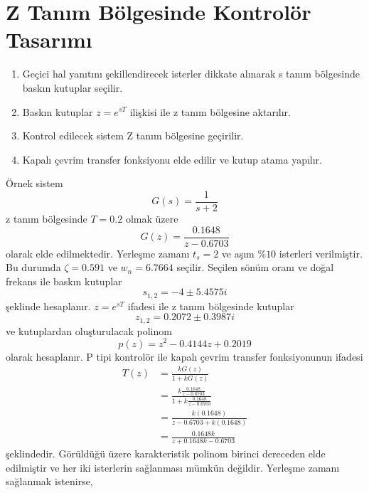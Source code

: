 \chapter{Z Tanım Bölgesinde Kontrolör Tasarımı}
\begin{enumerate}
    \item Geçici hal yanıtını şekillendirecek isterler dikkate alınarak s tanım bölgesinde baskın kutuplar seçilir. 
    \item Baskın kutuplar $z=e^{sT}$ ilişkisi ile z tanım bölgesine aktarılır. 
    \item Kontrol edilecek sistem Z tanım bölgesine geçirilir. 
    \item Kapalı çevrim transfer fonksiyonu elde edilir ve kutup atama yapılır.
\end{enumerate}
Örnek sistem
\begin{equation}
    G(s)=\frac{1}{s+2}
\end{equation}
z tanım bölgesinde $T=0.2$ olmak üzere
\begin{equation}
    G(z)=\frac{0.1648}{z-0.6703}
\end{equation}
olarak elde edilmektedir. Yerleşme zamanı $t_s=2$ ve aşım $\%10$ isterleri verilmiştir. Bu durumda $\zeta=0.591$ ve $w_n=6.7664$ seçilir. Seçilen sönüm oranı ve doğal frekans ile baskın kutuplar
\begin{equation}
    s_{1,2}=-4 \pm 5.4575i
\end{equation}
şeklinde hesaplanır. $z=e^{sT}$ ifadesi ile z tanım bölgesinde kutuplar
\begin{equation}
    z_{1,2}=0.2072 \pm 0.3987i
\end{equation}
ve kutuplardan oluşturulacak polinom
\begin{equation}
    p(z)=z^2-0.4144 z+0.2019
\end{equation}
olarak hesaplanır. P tipi kontrolör ile kapalı çevrim transfer fonksiyonunun ifadesi
\begin{equation}
\begin{split}
    T(z)&=\frac{kG(z)}{1+kG(z)}\\
    &=\frac{k\frac{0.1648}{z-0.6703}}{1+k\frac{0.1648}{z-0.6703}}\\
    &=\frac{k(0.1648)}{z-0.6703+k(0.1648)}\\
    &=\frac{0.1648k}{z+0.1648k-0.6703}
\end{split}
\end{equation}
şeklindedir. Görüldüğü üzere karakteristik polinom birinci dereceden elde edilmiştir ve her iki isterlerin sağlanması mümkün değildir. Yerleşme zamanı sağlanmak istenirse,
